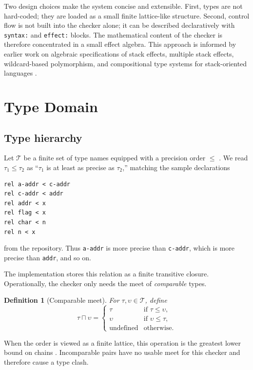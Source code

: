 \documentclass[11pt]{article}
\newtheorem{definition}{Definition}
\newcommand{\Types}{\mathcal{T}}
\newcommand{\glb}{\mathbin{\sqcap}}
\begin{document}
Two design choices make the system concise and extensible. First, types are not hard-coded; they are loaded as a small finite lattice-like structure. Second, control flow is not built into the checker alone; it can be described declaratively with \texttt{syntax:} and \texttt{effect:} blocks. The mathematical content of the checker is therefore concentrated in a small effect algebra. This approach is informed by earlier work on algebraic specifications of stack effects, multiple stack effects, wildcard-based polymorphism, and compositional type systems for stack-oriented languages \cite{poial1991algebraic,poial1992multiple,stoddart1993type,poial2002wildcards,saabas2006compositional,poial2006typing}.

\section{Type Domain}
\subsection{Type hierarchy}
Let $\Types$ be a finite set of type names equipped with a precision order $\leq$ \cite{davey2002lattices}. We read $\tau_1 \leq \tau_2$ as ``$\tau_1$ is at least as precise as $\tau_2$,'' matching the sample declarations
\begin{lstlisting}
rel a-addr < c-addr
rel c-addr < addr
rel addr < x
rel flag < x
rel char < n
rel n < x
\end{lstlisting}
from the repository. Thus \texttt{a-addr} is more precise than \texttt{c-addr}, which is more precise than \texttt{addr}, and so on.

The implementation stores this relation as a finite transitive closure. Operationally, the checker only needs the meet of \emph{comparable} types.

\begin{definition}[Comparable meet]
For $\tau,\upsilon \in \Types$, define
\[
\tau \glb \upsilon =
\begin{cases}
\tau & \text{if } \tau \leq \upsilon,\\
\upsilon & \text{if } \upsilon \leq \tau,\\
\text{undefined} & \text{otherwise.}
\end{cases}
\]
\end{definition}

When the order is viewed as a finite lattice, this operation is the greatest lower bound on chains \cite{davey2002lattices}. Incomparable pairs have no usable meet for this checker and therefore cause a type clash.
\end{document}
